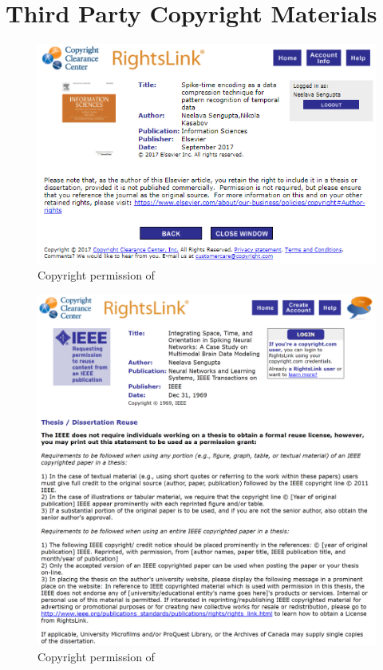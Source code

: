 
\chapter{Third Party Copyright Materials}
\label{app:copyright}
\captionsetup{list=no}
\begin{figure}
	\centering
	\includegraphics[width=0.8\linewidth]{fig/copyrights/information_sciences_spike.PNG}
	\caption{Copyright permission of \citet{sengupta2017spike}}
\end{figure}

\begin{figure}
	\centering
	\includegraphics[width=0.8\linewidth]{fig/copyrights/ieee_tnnls.PNG}
	\caption{Copyright permission of \citet{sengupta2018integrating}}
\end{figure}

